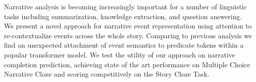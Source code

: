 Narrative analysis is becoming increasingly important for a number of linguistic tasks including summarization, knowledge extraction, and question answering. We present a novel approach for narrative event representation using attention to re-contextualize events across the whole story. Comparing to previous analysis we find an unexpected attachment of event semantics to predicate tokens within a popular transformer model. We test the utility of our approach on narrative completion prediction, achieving state of the art performance on Multiple Choice Narrative Cloze and scoring competitively on the Story Cloze Task.
